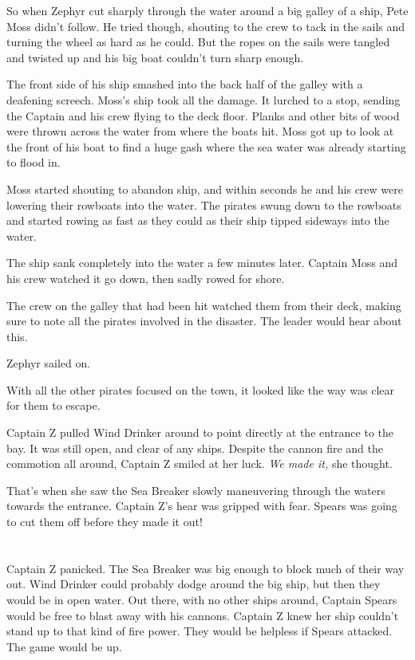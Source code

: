\documentclass[12pt]{extbook}
\begin{document}
  So when Zephyr cut sharply through the water around a big galley of a
  ship, Pete Moss didn't follow. He tried though, shouting to the crew to
  tack in the sails and turning the wheel as hard as he could. But the
  ropes on the sails were tangled and twisted up and his big boat couldn't
  turn sharp enough.
  
  The front side of his ship smashed into the back half of the galley with
  a deafening screech. Moss's ship took all the damage. It lurched to a
  stop, sending the Captain and his crew flying to the deck floor. Planks
  and other bits of wood were thrown across the water from where the boats
  hit. Moss got up to look at the front of his boat to find a huge gash
  where the sea water was already starting to flood in.
  
  Moss started shouting to abandon ship, and within seconds he and his
  crew were lowering their rowboats into the water. The pirates swung down
  to the rowboats and started rowing as fast as they could as their ship
  tipped sideways into the water.
  
  The ship sank completely into the water a few minutes later. Captain
  Moss and his crew watched it go down, then sadly rowed for shore.
  
  The crew on the galley that had been hit watched them from their deck,
  making sure to note all the pirates involved in the disaster. The leader
  would hear about this.
  
  Zephyr sailed on.
  
  With all the other pirates focused on the town, it looked like the way
  was clear for them to escape.
  
  Captain Z pulled Wind Drinker around to point directly at the entrance
  to the bay. It was still open, and clear of any ships. Despite the
  cannon fire and the commotion all around, Captain Z smiled at her luck.
  \emph{We made it,} she thought.
  
  That's when she saw the Sea Breaker slowly maneuvering through the
  waters towards the entrance. Captain Z's hear was gripped with fear.
  Spears was going to cut them off before they made it out!
  
  \section{}\label{section-38}
  
  Captain Z panicked. The Sea Breaker was big enough to block much of
  their way out. Wind Drinker could probably dodge around the big ship,
  but then they would be in open water. Out there, with no other ships
  around, Captain Spears would be free to blast away with his cannons.
  Captain Z knew her ship couldn't stand up to that kind of fire power.
  They would be helpless if Spears attacked. The game would be up.
  
\end{document}

